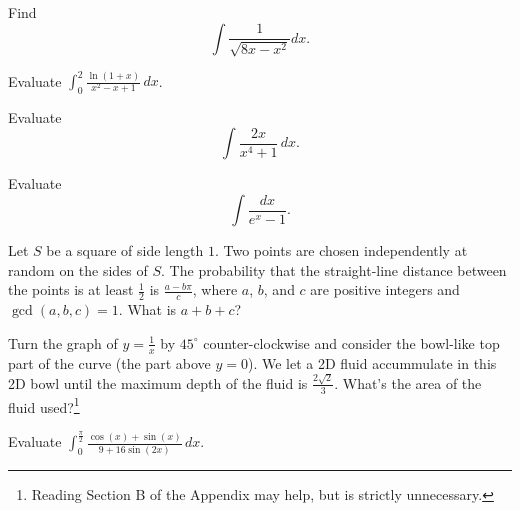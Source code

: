 \documentclass[mast]{lucky}
\begin{document}
\begin{prob}{6}
Find
\[\int \frac{1}{\sqrt{8x-x^2}}dx.\]
\end{prob}

\begin{prob}{6}
Evaluate $\int_0^2\frac{\ln(1+x)}{x^2-x+1}\,dx$.
\end{prob}

\begin{prob}{6}
Evaluate \[\int \frac{2x}{x^4 + 1}\,dx.\]
\end{prob}

\begin{prob}{9}
Evaluate \[\int \frac{dx}{e^x - 1}.\]
\end{prob}

\begin{req}[AMC 10A 2015/25]{9}
Let $S$ be a square of side length $1$.  Two points are chosen independently at random on the sides of $S$.  The probability that the straight-line distance between the points is at least $\tfrac12$ is $\tfrac{a-b\pi}c$, where $a$, $b$, and $c$ are positive integers and $\gcd(a,b,c)=1$.  What is $a+b+c$?
\end{req}

\begin{prob}[SMT 2019/7]{9}
Turn the graph of $y=\frac{1}{x}$ by $45^{\circ}$ counter-clockwise and consider the bowl-like top part of the curve (the part above $y=0$). We let a 2D fluid accummulate in this 2D bowl until the maximum depth of the fluid is $\frac{2\sqrt{2}}{3}.$ What’s the area of the fluid used?\footnote{Reading Section B of the Appendix may help, but is strictly unnecessary.}
\end{prob}

\begin{prob}{9}
Evaluate $\int_0^{\frac{\pi}{2}}\frac{\cos(x)+\sin(x)}{9+16\sin(2x)}\,dx$. %
\end{prob}
\end{document}
